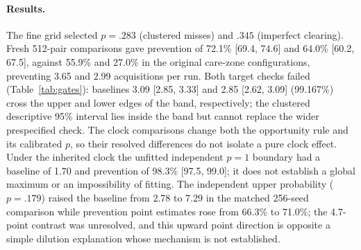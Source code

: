 \paragraph{Results.} The fine grid selected $p=.283$ (clustered misses) and
$.345$ (imperfect clearing). Fresh 512-pair comparisons gave prevention of
72.1\% [69.4, 74.6] and 64.0\% [60.2, 67.5], against 55.9\% and 27.0\% in the
original care-zone configurations, preventing 3.65 and 2.99 acquisitions per run.
Both target checks failed (Table~\ref{tab:gates}): baselines 3.09 [2.85, 3.33]
and 2.85 [2.62, 3.09] (99.167\%) cross the upper and lower edges of the band,
respectively; the clustered descriptive 95\% interval lies inside the band but
cannot replace the wider prespecified check. The clock comparisons change both
the opportunity rule and its calibrated $p$, so their resolved differences do
not isolate a pure clock effect. Under the inherited clock the unfitted
independent $p=1$ boundary had a baseline of 1.70 and prevention of 98.3\%
[97.5, 99.0]; it does not establish a global maximum or an impossibility of
fitting. The independent upper probability ($p=.179$) raised the baseline from
2.78 to 7.29 in the matched 256-seed comparison while prevention point estimates
rose from 66.3\% to 71.0\%; the 4.7-point contrast was unresolved, and this
upward point direction is opposite a simple dilution explanation whose mechanism
is not established.

